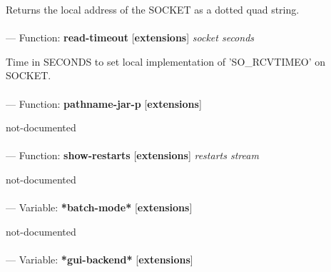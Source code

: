 \begin{adjustwidth}{5em}{5em}
Returns the local address of the SOCKET as a dotted quad string.
\end{adjustwidth}

\paragraph{}
\label{EXTENSIONS:READ-TIMEOUT}
--- Function: \textbf{read-timeout} [\textbf{extensions}] \textit{socket seconds}

\begin{adjustwidth}{5em}{5em}
Time in SECONDS to set local implementation of 'SO\_RCVTIMEO' on SOCKET.
\end{adjustwidth}

\paragraph{}
\label{EXTENSIONS:PATHNAME-JAR-P}
--- Function: \textbf{pathname-jar-p} [\textbf{extensions}] \textit{}

\begin{adjustwidth}{5em}{5em}
not-documented
\end{adjustwidth}

\paragraph{}
\label{EXTENSIONS:SHOW-RESTARTS}
--- Function: \textbf{show-restarts} [\textbf{extensions}] \textit{restarts stream}

\begin{adjustwidth}{5em}{5em}
not-documented
\end{adjustwidth}

\paragraph{}
\label{EXTENSIONS:*BATCH-MODE*}
--- Variable: \textbf{*batch-mode*} [\textbf{extensions}] \textit{}

\begin{adjustwidth}{5em}{5em}
not-documented
\end{adjustwidth}

\paragraph{}
\label{EXTENSIONS:*GUI-BACKEND*}
--- Variable: \textbf{*gui-backend*} [\textbf{extensions}] \textit{}

